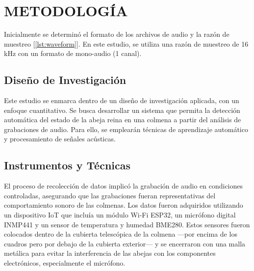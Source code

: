 \documentclass[12pt]{report}
\newenvironment{tightmulticols}{%
  \begin{multicols}{2}
  \setlength{\parskip}{0pt}
  \setlength{\parindent}{0em}
  \linespread{1}\selectfont
}{%
  \end{multicols}
}
\begin{document}
\pagebreak
\chapter{METODOLOGÍA}
\vspace{-3em}


\begin{tightmulticols}
Inicialmente se determinó el formato de los archivos de audio y la razón de muestreo [\ref{lst:waveform}]. En este estudio, se utiliza una razón de muestreo de 16 kHz con un formato de mono-audio (1 canal).

\section{Diseño de Investigación}

\par Este estudio se enmarca dentro de un diseño de investigación aplicada, con un enfoque cuantitativo. Se busca desarrollar un sistema que permita la detección automática del estado de la abeja reina en una colmena a partir del análisis de grabaciones de audio. Para ello, se emplearán técnicas de aprendizaje automático y procesamiento de señales acústicas.

\section{Instrumentos y Técnicas}

\par El proceso de recolección de datos implicó la grabación de audio en condiciones controladas, asegurando que las grabaciones fueran representativas del comportamiento sonoro de las colmenas. Los datos fueron adquiridos utilizando un dispositivo IoT que incluía un módulo Wi-Fi ESP32, un micrófono digital INMP441 y un sensor de temperatura y humedad BME280. Estos sensores fueron colocados dentro de la cubierta telescópica de la colmena —por encima de los cuadros pero por debajo de la cubierta exterior— y se encerraron con una malla metálica para evitar la interferencia de las abejas con los componentes electrónicos, especialmente el micrófono.


\end{tightmulticols}
\end{document}
